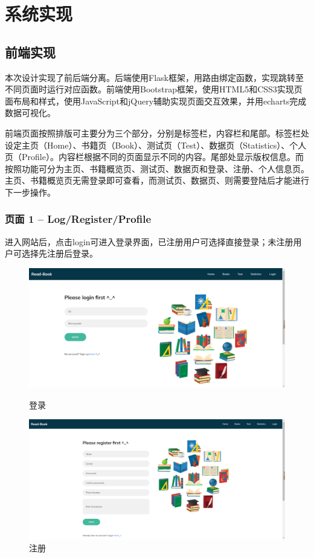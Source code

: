 \documentclass[twoside,11pt]{article}
\begin{document}
\section{系统实现}
\subsection{前端实现}

本次设计实现了前后端分离。后端使用Flask框架，用路由绑定函数，实现跳转至不同页面时运行对应函数。前端使用Bootstrap框架，使用HTML5和CSS3实现页面布局和样式，使用JavaScript和jQuery辅助实现页面交互效果，并用echarts完成数据可视化\cite{echarts}。

前端页面按照排版可主要分为三个部分，分别是标签栏，内容栏和尾部。标签栏处设定主页（Home）、书籍页（Book）、测试页（Test）、数据页（Statistics）、个人页（Profile）。内容栏根据不同的页面显示不同的内容。尾部处显示版权信息。而按照功能可分为主页、书籍概览页、测试页、数据页和登录、注册、个人信息页。主页、书籍概览页无需登录即可查看，而测试页、数据页、则需要登陆后才能进行下一步操作。

\subsubsection{页面 1 -- Log/Register/Profile}

进入网站后，点击login可进入登录界面，已注册用户可选择直接登录；未注册用户可选择先注册后登录。

\begin{figure}[htbp]
    \begin{minipage}[t]{0.5\linewidth}
        \centering
        \includegraphics[width=0.9\columnwidth]{figures/login.png}
        \caption{登录}\label{fig:login}
    \end{minipage}
    \begin{minipage}[t]{0.5\linewidth}
        \centering
        \includegraphics[width=0.9\columnwidth]{figures/reg.png}
        \caption{注册}\label{fig:reg}
    \end{minipage}
\end{figure}
\end{document}
